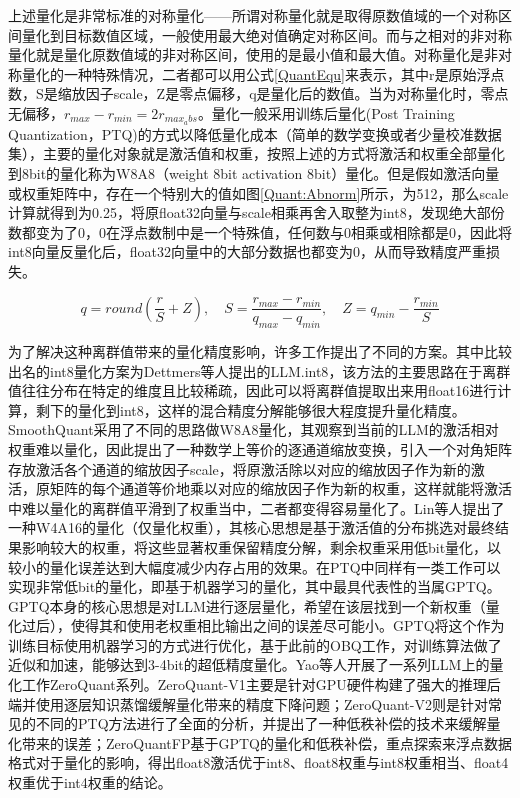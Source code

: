 上述量化是非常标准的对称量化——所谓对称量化就是取得原数值域的一个对称区间量化到目标数值区域，一般使用最大绝对值确定对称区间。而与之相对的非对称量化就是量化原数值域的非对称区间，使用的是最小值和最大值。对称量化是非对称量化的一种特殊情况，二者都可以用公式\ref{QuantEqu}来表示，其中r是原始浮点数，S是缩放因子scale，Z是零点偏移，q是量化后的数值。当为对称量化时，零点无偏移，$r_{max}-r_{min}=2r_{max_abs}$。量化一般采用训练后量化(Post Training Quantization，PTQ)的方式以降低量化成本（简单的数学变换或者少量校准数据集），主要的量化对象就是激活值和权重，按照上述的方式将激活和权重全部量化到8bit的量化称为W8A8（weight 8bit activation 8bit）量化。但是假如激活向量或权重矩阵中，存在一个特别大的值如图\ref{Quant:Abnorm}所示，为512，那么scale计算就得到为0.25，将原float32向量与scale相乘再舍入取整为int8，发现绝大部份数都变为了0，0在浮点数制中是一个特殊值，任何数与0相乘或相除都是0，因此将int8向量反量化后，float32向量中的大部分数据也都变为0，从而导致精度严重损失。

\begin{equation}
    q = round\left(\frac{r}{S} + Z\right), \quad S=\frac{r_{max}-r_{min}}{q_{max}-q_{min}}, \quad Z=q_{min}-\frac{r_{min}}{S}
    \label{QuantEqu}
\end{equation}

为了解决这种离群值带来的量化精度影响，许多工作提出了不同的方案。其中比较出名的int8量化方案为Dettmers等人提出的LLM.int8\cite{LLMINT8}，该方法的主要思路在于离群值往往分布在特定的维度且比较稀疏，因此可以将离群值提取出来用float16进行计算，剩下的量化到int8，这样的混合精度分解能够很大程度提升量化精度。SmoothQuant采用了不同的思路\cite{SmoothQuant}做W8A8量化，其观察到当前的LLM的激活相对权重难以量化，因此提出了一种数学上等价的逐通道缩放变换，引入一个对角矩阵存放激活各个通道的缩放因子scale，将原激活除以对应的缩放因子作为新的激活，原矩阵的每个通道等价地乘以对应的缩放因子作为新的权重，这样就能将激活中难以量化的离群值平滑到了权重当中，二者都变得容易量化了。Lin等人提出了一种W4A16的量化（仅量化权重）\cite{AWQ}，其核心思想是基于激活值的分布挑选对最终结果影响较大的权重，将这些显著权重保留精度分解，剩余权重采用低bit量化，以较小的量化误差达到大幅度减少内存占用的效果。在PTQ中同样有一类工作可以实现非常低bit的量化，即基于机器学习的量化，其中最具代表性的当属GPTQ。GPTQ\cite{GPTQ}本身的核心思想是对LLM进行逐层量化，希望在该层找到一个新权重（量化过后），使得其和使用老权重相比输出之间的误差尽可能小。GPTQ将这个作为训练目标使用机器学习的方式进行优化，基于此前的OBQ工作\cite{OBQ}，对训练算法做了近似和加速，能够达到3-4bit的超低精度量化。Yao等人开展了一系列LLM上的量化工作ZeroQuant系列\cite{ZeroQuant1,ZeroQuant2,ZeroQuantFP}。ZeroQuant-V1主要是针对GPU硬件构建了强大的推理后端并使用逐层知识蒸馏缓解量化带来的精度下降问题\cite{ZeroQuant1}；ZeroQuant-V2则是针对常见的不同的PTQ方法进行了全面的分析，并提出了一种低秩补偿的技术来缓解量化带来的误差\cite{ZeroQuant2}；ZeroQuantFP基于GPTQ的量化和低秩补偿，重点探索来浮点数据格式对于量化的影响，得出float8激活优于int8、float8权重与int8权重相当、float4权重优于int4权重的结论\cite{ZeroQuantFP}。

